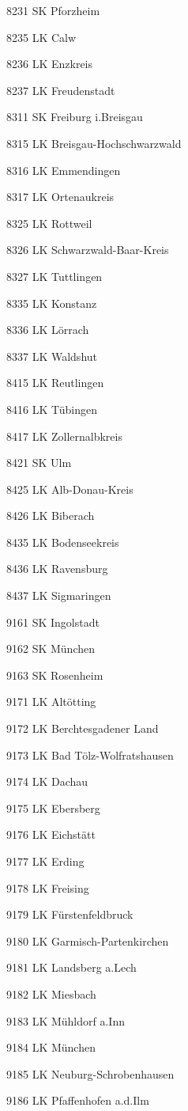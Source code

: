 8231  SK Pforzheim

8235  LK Calw

8236  LK Enzkreis

8237  LK Freudenstadt

8311  SK Freiburg i.Breisgau

8315  LK Breisgau-Hochschwarzwald

8316  LK Emmendingen

8317  LK Ortenaukreis

8325  LK Rottweil

8326  LK Schwarzwald-Baar-Kreis

8327  LK Tuttlingen

8335  LK Konstanz

8336  LK Lörrach

8337  LK Waldshut

8415  LK Reutlingen

8416  LK Tübingen

8417  LK Zollernalbkreis

8421  SK Ulm

8425  LK Alb-Donau-Kreis

8426  LK Biberach

8435  LK Bodenseekreis

8436  LK Ravensburg

8437  LK Sigmaringen

9161  SK Ingolstadt

9162  SK München

9163  SK Rosenheim

9171  LK Altötting

9172  LK Berchtesgadener Land

9173  LK Bad Tölz-Wolfratshausen

9174  LK Dachau

9175  LK Ebersberg

9176  LK Eichstätt

9177  LK Erding

9178  LK Freising

9179  LK Fürstenfeldbruck

9180  LK Garmisch-Partenkirchen

9181  LK Landsberg a.Lech

9182  LK Miesbach

9183  LK Mühldorf a.Inn

9184  LK München

9185  LK Neuburg-Schrobenhausen

9186  LK Pfaffenhofen a.d.Ilm

